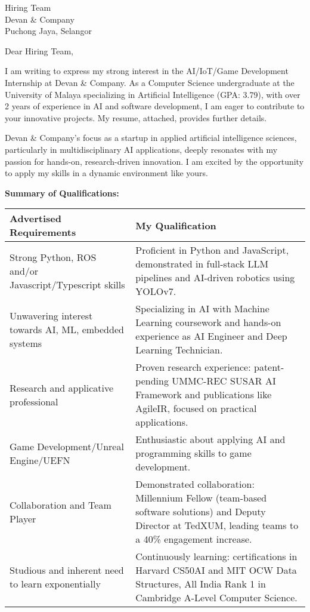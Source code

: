 \documentclass[10.5pt]{letter}
\date{\today}
\begin{document}
\begin{letter}{Hiring Team\\Devan \& Company\\Puchong Jaya, Selangor}

\opening{Dear Hiring Team,}

I am writing to express my strong interest in the AI/IoT/Game Development Internship at Devan \& Company. As a Computer Science undergraduate at the University of Malaya specializing in Artificial Intelligence (GPA: 3.79), with over 2 years of experience in AI and software development, I am eager to contribute to your innovative projects. My resume, attached, provides further details.

Devan \& Company's focus as a startup in applied artificial intelligence sciences, particularly in multidisciplinary AI applications, deeply resonates with my passion for hands-on, research-driven innovation. I am excited by the opportunity to apply my skills in a dynamic environment like yours.

\vspace{0.3cm}
\textbf{Summary of Qualifications:}
\vspace{0.2cm}

\renewcommand{\arraystretch}{1.3}
\begin{tabularx}{\textwidth}{@{}p{}X@{}}
\textbf{Advertised Requirements} & \textbf{My Qualification} \\
\hline
Strong Python, ROS and/or Javascript/Typescript skills & Proficient in Python and JavaScript, demonstrated in full-stack LLM pipelines and AI-driven robotics using YOLOv7. \\
Unwavering interest towards AI, ML, embedded systems & Specializing in AI with Machine Learning coursework and hands-on experience as AI Engineer and Deep Learning Technician. \\
Research and applicative professional & Proven research experience: patent-pending UMMC-REC SUSAR AI Framework and publications like AgileIR, focused on practical applications. \\
Game Development/Unreal Engine/UEFN &  Enthusiastic about applying AI and programming skills to game development.  \\
Collaboration and Team Player & Demonstrated collaboration: Millennium Fellow (team-based software solutions) and Deputy Director at TedXUM, leading teams to a 40\% engagement increase. \\
Studious and inherent need to learn exponentially &  Continuously learning: certifications in Harvard CS50AI and MIT OCW Data Structures, All India Rank 1 in Cambridge A-Level Computer Science. \\
\end{tabularx}


\end{letter}
\end{document}
